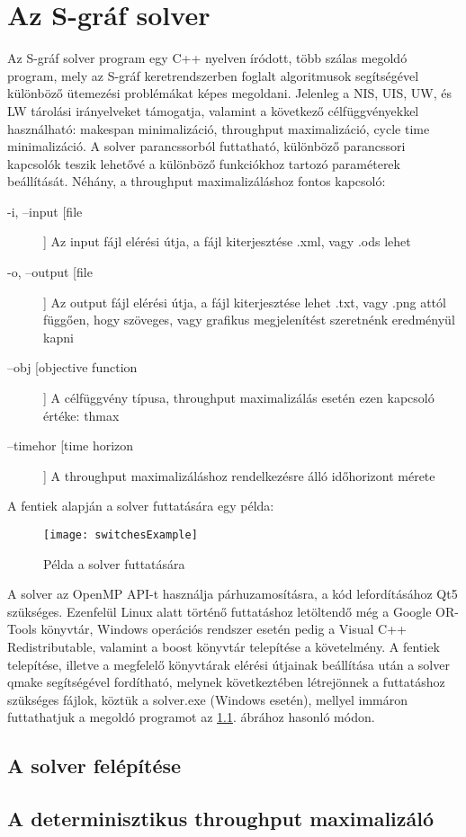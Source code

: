 \chapter{Az S-gráf solver} \label{s-graph_framework}
Az S-gráf solver program egy C++ nyelven íródott, több szálas megoldó program, mely az S-gráf keretrendszerben foglalt algoritmusok segítségével különböző ütemezési problémákat képes megoldani.
Jelenleg a NIS, UIS, UW, és LW tárolási irányelveket támogatja, valamint a következő célfüggvényekkel használható: makespan minimalizáció, throughput maximalizáció, cycle time minimalizáció.
A solver parancssorból futtatható, különböző parancssori kapcsolók teszik lehetővé a különböző funkciókhoz tartozó paraméterek beállítását.
Néhány, a throughput maximalizáláshoz fontos kapcsoló:
\begin{description}
\item[-i, --input [file]] Az input fájl elérési útja, a fájl kiterjesztése .xml, vagy .ods lehet
\item[-o, --output [file]] Az output fájl elérési útja, a fájl kiterjesztése lehet .txt, vagy .png attól függően, hogy szöveges, vagy grafikus megjelenítést szeretnénk eredményül kapni
\item[--obj [objective function]] A célfüggvény típusa, throughput maximalizálás esetén ezen kapcsoló értéke: thmax
\item[--timehor [time horizon]] A throughput maximalizáláshoz rendelkezésre álló időhorizont mérete 
\end{description}
A fentiek alapján a solver futtatására egy példa:
\begin{figure}[H]
\begin{center}
\texttt{[image: switchesExample]}
\caption{Példa a solver futtatására}
\label{switchExample}
\end{center}
\end{figure}
A solver az OpenMP API-t használja párhuzamosításra, a kód lefordításához Qt5 szükséges.
Ezenfelül Linux alatt történő futtatáshoz letöltendő még a Google OR-Tools könyvtár, Windows operációs rendszer esetén pedig a Visual C++ Redistributable, valamint a boost könyvtár telepítése a követelmény.
A fentiek telepítése, illetve a megfelelő könyvtárak elérési útjainak beállítása után a solver qmake segítségével fordítható, melynek következtében létrejönnek a futtatáshoz szükséges fájlok, köztük a solver.exe (Windows esetén), mellyel immáron futtathatjuk a megoldó programot az \ref{switchExample}. ábrához hasonló módon.   
\section{A solver felépítése}
\section{A determinisztikus throughput maximalizáló} \label{throughput_solver}